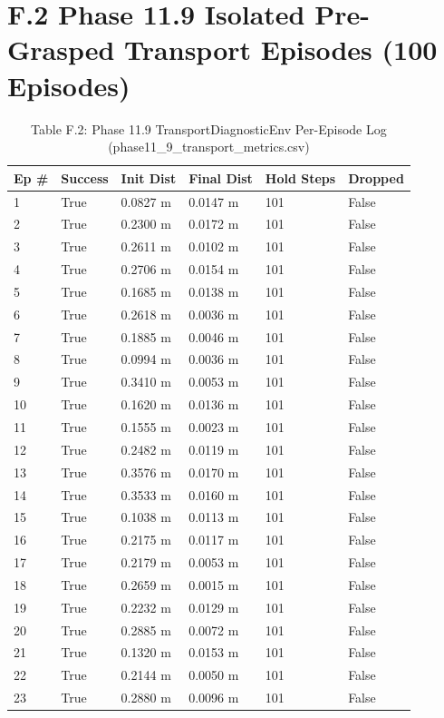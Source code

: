 \documentclass[11pt,a4paper,oneside]{book}
\begin{document}
\section{F.2 Phase 11.9 Isolated Pre-Grasped Transport Episodes (100 Episodes)}
\begin{longtable}{l l l l l l}\caption{Table F.2: Phase 11.9 TransportDiagnosticEnv Per-Episode Log (phase11\_9\_transport\_metrics.csv)}\\\toprule
Ep \# & Success & Init Dist & Final Dist & Hold Steps & Dropped \\ \midrule \endhead
1 & True & 0.0827 m & 0.0147 m & 101 & False \\
2 & True & 0.2300 m & 0.0172 m & 101 & False \\
3 & True & 0.2611 m & 0.0102 m & 101 & False \\
4 & True & 0.2706 m & 0.0154 m & 101 & False \\
5 & True & 0.1685 m & 0.0138 m & 101 & False \\
6 & True & 0.2618 m & 0.0036 m & 101 & False \\
7 & True & 0.1885 m & 0.0046 m & 101 & False \\
8 & True & 0.0994 m & 0.0036 m & 101 & False \\
9 & True & 0.3410 m & 0.0053 m & 101 & False \\
10 & True & 0.1620 m & 0.0136 m & 101 & False \\
11 & True & 0.1555 m & 0.0023 m & 101 & False \\
12 & True & 0.2482 m & 0.0119 m & 101 & False \\
13 & True & 0.3576 m & 0.0170 m & 101 & False \\
14 & True & 0.3533 m & 0.0160 m & 101 & False \\
15 & True & 0.1038 m & 0.0113 m & 101 & False \\
16 & True & 0.2175 m & 0.0117 m & 101 & False \\
17 & True & 0.2179 m & 0.0053 m & 101 & False \\
18 & True & 0.2659 m & 0.0015 m & 101 & False \\
19 & True & 0.2232 m & 0.0129 m & 101 & False \\
20 & True & 0.2885 m & 0.0072 m & 101 & False \\
21 & True & 0.1320 m & 0.0153 m & 101 & False \\
22 & True & 0.2144 m & 0.0050 m & 101 & False \\
23 & True & 0.2880 m & 0.0096 m & 101 & False \\

\end{longtable}
\end{document}
